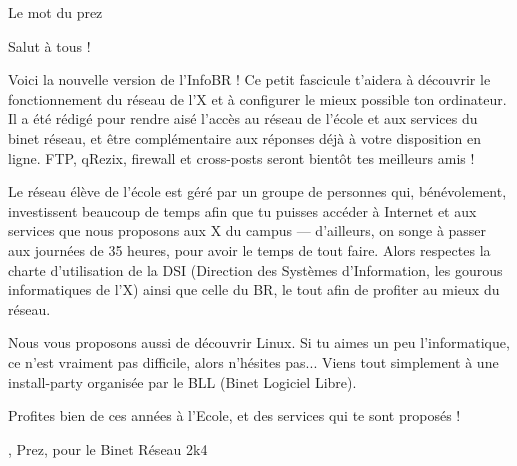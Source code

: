 \begin{center}
	{ \LARGE Le mot du prez } 
\end{center}

Salut \`a tous !

Voici la nouvelle version de l'InfoBR ! Ce petit fascicule t'aidera \`a d\'ecouvrir le fonctionnement du r\'eseau de l'X et \`a configurer le mieux possible ton ordinateur. Il a \'et\'e r\'edig\'e pour rendre ais\'e l'acc\`es au r\'eseau de l'\'ecole et aux services du binet r\'eseau, et \^etre compl\'ementaire aux r\'eponses d\'ej\`a \`a votre disposition en ligne. FTP, qRezix, firewall et cross-posts seront bient\^ot tes meilleurs amis !

Le r\'eseau \'el\`eve de l'\'ecole est g\'er\'e par un groupe de personnes qui, b\'en\'evolement, investissent beaucoup de temps afin que tu puisses acc\'eder \`a Internet et aux services que nous proposons aux X du campus --- d'ailleurs, on songe \`a passer aux journ\'ees de 35 heures, pour avoir le temps de tout faire. Alors respectes la charte d'utilisation de la DSI (Direction des Syst\`emes d'Information, les gourous informatiques de l'X) ainsi que celle du BR, le tout afin de profiter au mieux du r\'eseau.

Nous vous proposons aussi de d\'ecouvrir Linux. Si tu aimes un peu l'informatique, ce n'est vraiment pas difficile, alors n'h\'esites pas... Viens tout simplement \`a une install-party organis\'ee par le BLL (Binet Logiciel Libre).

Profites bien de ces ann\'ees \`a l'Ecole, et des services qui te sont propos\'es !
\begin{flushright}
	, Prez, pour le Binet R\'eseau 2k4 
\end{flushright}
